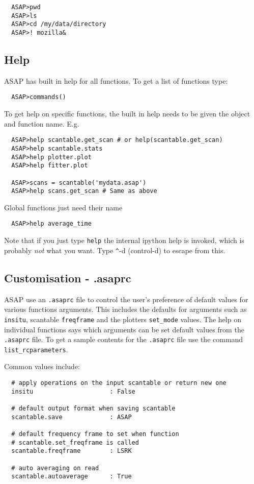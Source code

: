 \documentclass[11pt]{article}
\newcommand{\cmd}[1]{{\tt #1}}
\begin{document}
\begin{verbatim}
  ASAP>pwd
  ASAP>ls
  ASAP>cd /my/data/directory
  ASAP>! mozilla&
\end{verbatim}

\subsection{Help}

ASAP has built in help for all functions. To get a list of
functions type:

\begin{verbatim}
  ASAP>commands()
\end{verbatim}

To get help on specific functions, the built in help needs to be given
the object and function name. E.g.

\begin{verbatim}
  ASAP>help scantable.get_scan # or help(scantable.get_scan)
  ASAP>help scantable.stats
  ASAP>help plotter.plot
  ASAP>help fitter.plot

  ASAP>scans = scantable('mydata.asap')
  ASAP>help scans.get_scan # Same as above
\end{verbatim}

Global functions just need their name

\begin{verbatim}
  ASAP>help average_time
\end{verbatim}

Note that if you just type \cmd{help} the internal ipython help is
invoked, which is probably {\em not} what you want. Type \verb+^+-d
(control-d) to escape from this.

\subsection{Customisation - .asaprc}

ASAP use an \cmd{.asaprc} file to control the user's
preference of default values for various functions arguments. This
includes the defaults for arguments such as \cmd{insitu}, scantable
\cmd{freqframe} and the plotters \cmd{set\_mode} values. The help on
individual functions says which arguments can be set default values
from the \cmd{.asaprc} file. To get a sample contents for the
\cmd{.asaprc} file use the command \cmd{list\_rcparameters}.

Common values include:
\begin{verbatim}
  # apply operations on the input scantable or return new one
  insitu                     : False

  # default output format when saving scantable
  scantable.save             : ASAP

  # default frequency frame to set when function
  # scantable.set_freqframe is called
  scantable.freqframe        : LSRK

  # auto averaging on read
  scantable.autoaverage      : True
\end{verbatim}
\end{document}
